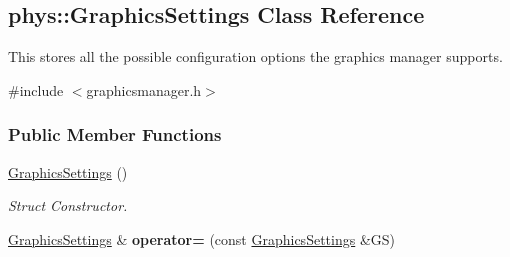 \hypertarget{structphys_1_1GraphicsSettings}{
\subsection{phys::GraphicsSettings Class Reference}
\label{structphys_1_1GraphicsSettings}
}


This stores all the possible configuration options the graphics manager supports.  




{\ttfamily \#include $<$graphicsmanager.h$>$}

\subsubsection*{Public Member Functions}
\begin{DoxyCompactItemize}
\item 
\hypertarget{structphys_1_1GraphicsSettings_aceaaf53585413067adbf271e2c1e48fa}{
\hyperlink{structphys_1_1GraphicsSettings_aceaaf53585413067adbf271e2c1e48fa}{GraphicsSettings} ()}
\label{structphys_1_1GraphicsSettings_aceaaf53585413067adbf271e2c1e48fa}

\begin{DoxyCompactList}\small\item\em Struct Constructor. \item\end{DoxyCompactList}\item 
\hypertarget{structphys_1_1GraphicsSettings_a9f9ae60c530d078307cf3ee9f39821fe}{
\hyperlink{structphys_1_1GraphicsSettings}{GraphicsSettings} \& {\bfseries operator=} (const \hyperlink{structphys_1_1GraphicsSettings}{GraphicsSettings} \&GS)}
\label{structphys_1_1GraphicsSettings_a9f9ae60c530d078307cf3ee9f39821fe}

\end{DoxyCompactItemize}
